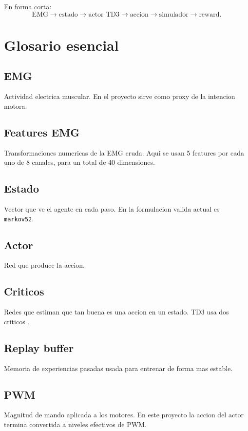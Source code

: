 \documentclass[11pt,a4paper]{article}
\begin{document}
En forma corta:
\[
\text{EMG} \rightarrow \text{estado} \rightarrow \text{actor TD3} \rightarrow \text{accion} \rightarrow \text{simulador} \rightarrow \text{reward}.
\]

\section{Glosario esencial}

\subsection*{EMG}
Actividad electrica muscular. En el proyecto sirve como proxy de la intencion motora.

\subsection*{Features EMG}
Transformaciones numericas de la EMG cruda. Aqui se usan 5 features por cada uno de 8 canales, para un total de 40 dimensiones.

\subsection*{Estado}
Vector que ve el agente en cada paso. En la formulacion valida actual es \texttt{markov52}.

\subsection*{Actor}
Red que produce la accion.

\subsection*{Criticos}
Redes que estiman que tan buena es una accion en un estado. TD3 usa dos criticos \citep{fujimoto2018td3}.

\subsection*{Replay buffer}
Memoria de experiencias pasadas usada para entrenar de forma mas estable.

\subsection*{PWM}
Magnitud de mando aplicada a los motores. En este proyecto la accion del actor termina convertida a niveles efectivos de PWM.
\end{document}
